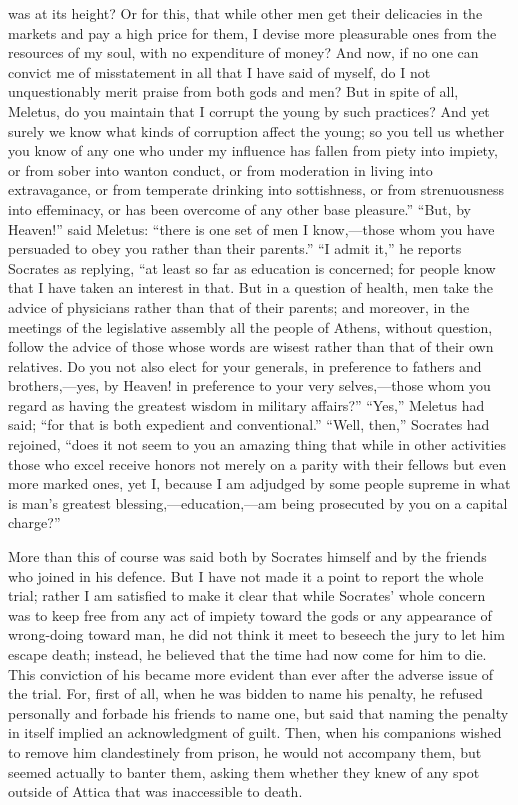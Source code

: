\documentclass[12pt]{article}
\begin{document}
was at its height? Or for this, that while other men get their delicacies in
the markets and pay a high price for them, I devise more pleasurable ones from
the resources of my soul, with no expenditure of money? And now, if no one can
convict me of misstatement in all that I have said of myself, do I not
unquestionably merit praise from both gods and men? But in spite of all,
Meletus, do you maintain that I corrupt the young by such practices? And yet
surely we know what kinds of corruption affect the young; so you tell us
whether you know of any one who under my influence has fallen from piety into
impiety, or from sober into wanton conduct, or from moderation in living into
extravagance, or from temperate drinking into sottishness, or from
strenuousness into effeminacy, or has been overcome of any other base
pleasure.'' ``But, by Heaven!'' said Meletus: ``there is one set of men I
know,---those whom you have persuaded to obey you rather than their parents.''
``I admit it,'' he reports Socrates as replying, ``at least so far as education
is concerned; for people know that I have taken an interest in that. But in a
question of health, men take the advice of physicians rather than that of their
parents; and moreover, in the meetings of the legislative assembly all the
people of Athens, without question, follow the advice of those whose words are
wisest rather than that of their own relatives. Do you not also elect for your
generals, in preference to fathers and brothers,---yes, by Heaven! in
preference to your very selves,---those whom you regard as having the greatest
wisdom in military affairs?'' ``Yes,'' Meletus had said; ``for that is both
expedient and conventional.'' ``Well, then,'' Socrates had rejoined, ``does it
not seem to you an amazing thing that while in other activities those who excel
receive honors not merely on a parity with their fellows but even more marked
ones, yet I, because I am adjudged by some people supreme in what is man's
greatest blessing,---education,---am being prosecuted by you on a capital
charge?''

More than this of course was said both by Socrates himself and by the friends
who joined in his defence. But I have not made it a point to report the whole
trial; rather I am satisfied to make it clear that while Socrates' whole
concern was to keep free from any act of impiety toward the gods or any
appearance of wrong-doing toward man, he did not think it meet to beseech the
jury to let him escape death; instead, he believed that the time had now come
for him to die. This conviction of his became more evident than ever after the
adverse issue of the trial. For, first of all, when he was bidden to name his
penalty, he refused personally and forbade his friends to name one, but said
that naming the penalty in itself implied an acknowledgment of guilt. Then,
when his companions wished to remove him clandestinely from prison, he would
not accompany them, but seemed actually to banter them, asking them whether
they knew of any spot outside of Attica that was inaccessible to death.
\end{document}
